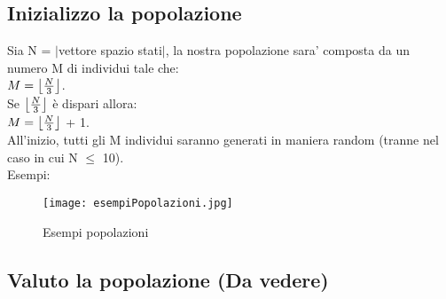 \documentclass[10pt,a4paper]{article}
\begin{document}
    \subsection{Inizializzo la popolazione}
      \label{inizializzoLaPopolazioneSubsection}
      Sia N = $\lvert$vettore spazio stati$\rvert$, la nostra popolazione sara' composta da un numero M di individui tale che:\\ 
      $ M = \bigl\lfloor {N \over 3} \bigl\rfloor $.\\
      Se $\bigl\lfloor {N \over 3} \bigl\rfloor $ è dispari allora:\\ 
      $ M = \bigl\lfloor {N \over 3} \bigl\rfloor $ + 1.\\
      All'inizio, tutti gli M individui saranno generati in maniera random (tranne nel caso in cui N $\leq$ 10).\\
      Esempi:
      \begin{figure}
        \centering
        \caption{Esempi popolazioni}
        \texttt{[image: esempiPopolazioni.jpg]}
        \label{esempiPopolazioni}
      \end{figure}
      
      \newpage
      
    \subsection{Valuto la popolazione (Da vedere)}
      \label{valutoLaPopolazioneSubsection}
      
\end{document}
